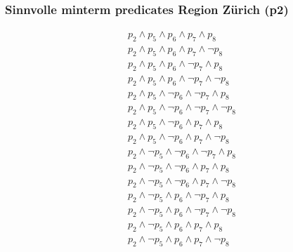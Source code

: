 \documentclass[11pt,a4paper,parskip=half]{scrartcl}
\begin{document}
\subsubsection{Sinnvolle minterm predicates Region Zürich (p2)}
\begin{align*}
p_2 \wedge p_5 \wedge p_6 \wedge p_7 \wedge p_8\\
p_2 \wedge p_5 \wedge p_6 \wedge p_7 \wedge \neg p_8\\
p_2 \wedge p_5 \wedge p_6 \wedge \neg p_7 \wedge p_8\\
p_2 \wedge p_5 \wedge p_6 \wedge \neg p_7 \wedge \neg p_8\\
p_2 \wedge p_5 \wedge \neg p_6 \wedge \neg p_7 \wedge p_8\\
p_2 \wedge p_5 \wedge \neg p_6 \wedge \neg p_7 \wedge \neg p_8\\
p_2 \wedge p_5 \wedge \neg p_6 \wedge  p_7 \wedge p_8\\
p_2 \wedge p_5 \wedge \neg p_6 \wedge  p_7 \wedge \neg p_8\\
p_2 \wedge \neg p_5 \wedge \neg p_6 \wedge \neg p_7 \wedge p_8\\
p_2 \wedge \neg p_5 \wedge \neg p_6 \wedge  p_7 \wedge p_8\\
p_2 \wedge \neg p_5 \wedge \neg p_6 \wedge  p_7 \wedge \neg p_8\\
p_2 \wedge \neg p_5 \wedge  p_6 \wedge \neg p_7 \wedge p_8\\
p_2 \wedge \neg p_5 \wedge  p_6 \wedge \neg p_7 \wedge \neg p_8\\
p_2 \wedge \neg p_5 \wedge  p_6 \wedge  p_7 \wedge  p_8\\
p_2 \wedge \neg p_5 \wedge  p_6 \wedge  p_7 \wedge \neg p_8\\
\end{align*}
\end{document}
